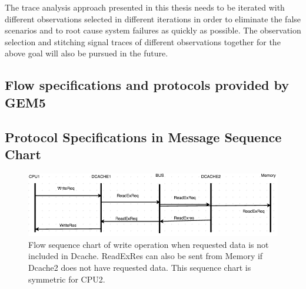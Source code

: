 \documentclass[12pt,frontmatter,copyright,thesis]{usfmanus}
\begin{document}
The trace analysis approach presented in this thesis needs to
be iterated with different observations selected in
different iterations in order to eliminate the false
scenarios and to root cause system failures as quickly as
possible.  The observation selection and stitching signal
traces of different observations together for the above goal
will also be pursued in the future.





\begin{appendix}

\chapter{Flow specifications and protocols provided by GEM5}
\section{Protocol Specifications in Message Sequence Chart}
\begin{figure}[h]
\centering
 \includegraphics[width=4.5In]{figures/write3.png}
 \caption{\footnotesize Flow sequence chart of write operation when requested data is not included in Dcache. ReadExRes can also be sent from Memory if Dcache2 does not have requested data. This sequence chart is symmetric for CPU2. }
 \label{write3}


\end{figure}
\end{appendix}
\end{document}
